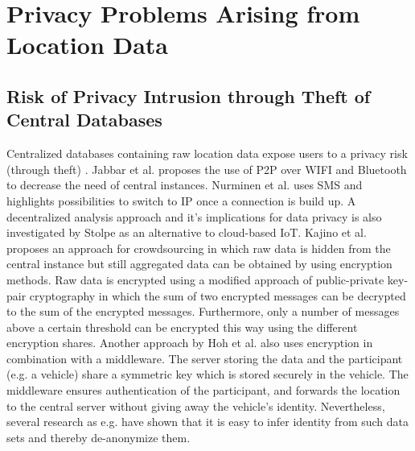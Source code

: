 \section{Privacy Problems Arising from Location Data}
\subsection{Risk of Privacy Intrusion through Theft of Central Databases}
Centralized databases containing raw location data expose users to a privacy risk (through theft) \parencite{iot, hoh2006enhancing}. Jabbar et al. \parencite{p2p-android} proposes the use of P2P over WIFI and Bluetooth to decrease the need of central instances. Nurminen et al. \parencite{nurminen2006p2p} uses SMS and highlights possibilities to switch to IP once a connection is build up. A decentralized analysis approach and it's implications for data privacy is also investigated by Stolpe \parencite{iot} as an alternative to cloud-based IoT.
Kajino et al. \parencite{crowdsourcing} proposes an approach for crowdsourcing in which raw data is hidden from the central instance but still aggregated data can be obtained by using encryption methods. Raw data is encrypted using a modified approach of public-private key-pair cryptography in which the sum of two encrypted messages can be decrypted to the sum of the encrypted messages. Furthermore, only a number of messages above a certain threshold can be encrypted this way using the different encryption shares.
Another approach by Hoh et al. \parencite{hoh2006enhancing} also uses encryption in combination with a middleware. The server storing the data and the participant (e.g. a vehicle) share a symmetric key which is stored securely in the vehicle. The middleware ensures authentication of the participant, and forwards the location to the central server without giving away the vehicle's identity. Nevertheless, several research as e.g. \parencite{krumm, twitter, cellphone} have shown that it is easy to infer identity from such data sets and thereby de-anonymize them. 

